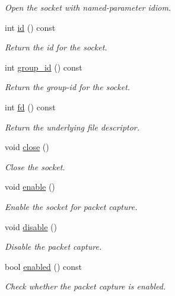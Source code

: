 \begin{DoxyCompactItemize}
\begin{DoxyCompactList}\small\item\em Open the socket with named-\/parameter idiom. \end{DoxyCompactList}\item 
int \hyperlink{classpfq_1_1socket_af3f79e9a42964907acd581d35d42da00}{id} () const 
\begin{DoxyCompactList}\small\item\em Return the id for the socket. \end{DoxyCompactList}\item 
int \hyperlink{classpfq_1_1socket_a0b82186997f22efffd336b09b19a806d}{group\+\_\+id} () const 
\begin{DoxyCompactList}\small\item\em Return the group-\/id for the socket. \end{DoxyCompactList}\item 
int \hyperlink{classpfq_1_1socket_ad4f1a171d31215afd6aad769a5e4b004}{fd} () const 
\begin{DoxyCompactList}\small\item\em Return the underlying file descriptor. \end{DoxyCompactList}\item 
void \hyperlink{classpfq_1_1socket_a4c179188ea8fceeb5fd47d52f93c6bda}{close} ()
\begin{DoxyCompactList}\small\item\em Close the socket. \end{DoxyCompactList}\item 
void \hyperlink{classpfq_1_1socket_a5b25af762946405695f4192b08c04146}{enable} ()
\begin{DoxyCompactList}\small\item\em Enable the socket for packet capture. \end{DoxyCompactList}\item 
void \hyperlink{classpfq_1_1socket_ac7e918bff7d1672125a8549dae750dcc}{disable} ()
\begin{DoxyCompactList}\small\item\em Disable the packet capture. \end{DoxyCompactList}\item 
bool \hyperlink{classpfq_1_1socket_acec42300a779676e326844209c1c0948}{enabled} () const 
\begin{DoxyCompactList}\small\item\em Check whether the packet capture is enabled. \end{DoxyCompactList}\item 

\end{DoxyCompactItemize}
